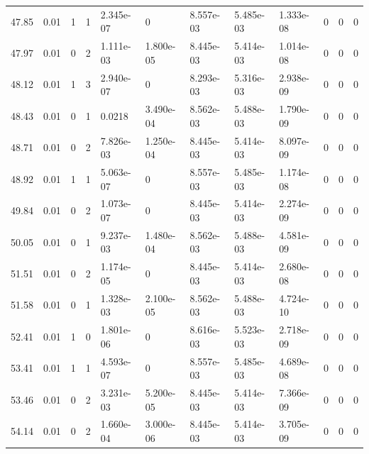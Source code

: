 \documentclass[preview]{standalone}
\begin{document}
{{{\begin{tabular}{L{1.2cm}C{1.2cm} C{0.3cm}C{0.5cm} C{1.4cm}C{1.4cm} C{1.4cm}C{1.4cm} C{1.6cm}C{1.6cm} C{1.6cm}C{1.6cm}}
  47.85  &  0.01  & 1     &  1 &  2.345e-07  & 0  &  8.557e-03&   5.485e-03& 1.333e-08 & 0   &  0 & 0  \\ 
  47.97  &  0.01  & 0     &  2 &  1.111e-03  & 1.800e-05  &  8.445e-03&   5.414e-03& 1.014e-08 & 0   &  0 & 0  \\ 
  48.12  &  0.01  & 1     &  3 &  2.940e-07  & 0  &  8.293e-03&   5.316e-03& 2.938e-09 & 0   &  0 & 0  \\ 
  48.43  &  0.01  & 0     &  1 &  0.0218  & 3.490e-04  &  8.562e-03&   5.488e-03& 1.790e-09 & 0   &  0 & 0  \\ 
  48.71  &  0.01  & 0     &  2 &  7.826e-03  & 1.250e-04  &  8.445e-03&   5.414e-03& 8.097e-09 & 0   &  0 & 0  \\ 
  48.92  &  0.01  & 1     &  1 &  5.063e-07  & 0  &  8.557e-03&   5.485e-03& 1.174e-08 & 0   &  0 & 0  \\ 
  49.84  &  0.01  & 0     &  2 &  1.073e-07  & 0  &  8.445e-03&   5.414e-03& 2.274e-09 & 0   &  0 & 0  \\ 
  50.05  &  0.01  & 0     &  1 &  9.237e-03  & 1.480e-04  &  8.562e-03&   5.488e-03& 4.581e-09 & 0   &  0 & 0  \\ 
  51.51  &  0.01  & 0     &  2 &  1.174e-05  & 0  &  8.445e-03&   5.414e-03& 2.680e-08 & 0   &  0 & 0  \\ 
  51.58  &  0.01  & 0     &  1 &  1.328e-03  & 2.100e-05  &  8.562e-03&   5.488e-03& 4.724e-10 & 0   &  0 & 0  \\ 
  52.41  &  0.01  & 1     &  0 &  1.801e-06  & 0  &  8.616e-03&   5.523e-03& 2.718e-09 & 0   &  0 & 0  \\ 
  53.41  &  0.01  & 1     &  1 &  4.593e-07  & 0  &  8.557e-03&   5.485e-03& 4.689e-08 & 0   &  0 & 0  \\ 
  53.46  &  0.01  & 0     &  2 &  3.231e-03  & 5.200e-05  &  8.445e-03&   5.414e-03& 7.366e-09 & 0   &  0 & 0  \\ 
  54.14  &  0.01  & 0     &  2 &  1.660e-04  & 3.000e-06  &  8.445e-03&   5.414e-03& 3.705e-09 & 0   &  0 & 0  \\ 
\hline 
\end{tabular} 

}}}
\end{document}
